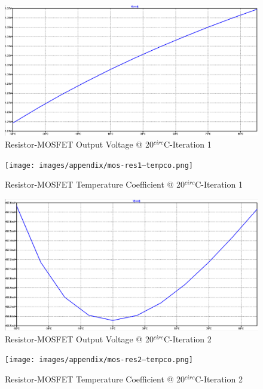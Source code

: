 \begin{figure}[!htbp]
  	\centering
  	\includegraphics[scale=0.15]{images/appendix/mos-res1-vref.png}
  	\caption[output-z-meas]{Resistor-MOSFET Output Voltage @ 20$^{circ}$C-Iteration 1}
  	\label{fig:mos-res1-vref}
	\end{figure}
\begin{figure}[!htbp]
  	\centering
  	\texttt{[image: images/appendix/mos-res1--tempco.png]}
  	\caption[output-z-meas]{Resistor-MOSFET Temperature Coefficient @ 20$^{circ}$C-Iteration 1}
  	\label{fig:mos-res1-tempco}
	\end{figure}
\begin{figure}[!htbp]
  	\centering
  	\includegraphics[scale=0.15]{images/appendix/mos-res2-vref.png}
  	\caption[output-z-meas]{Resistor-MOSFET Output Voltage @ 20$^{circ}$C-Iteration 2}
  	\label{fig:mos-res2-vref}
	\end{figure}
\begin{figure}[!htbp]
  	\centering
  	\texttt{[image: images/appendix/mos-res2--tempco.png]}
  	\caption[output-z-meas]{Resistor-MOSFET Temperature Coefficient @ 20$^{circ}$C-Iteration 2}
  	\label{fig:mos-res2-tempco}
	\end{figure}

